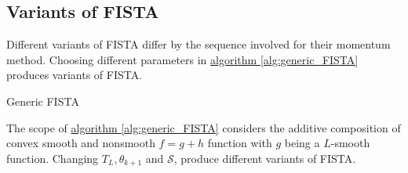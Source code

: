 \documentclass[]{article}
\theoremstyle{definition}
\numberwithin{equation}{subsection}
\begin{document}
    \subsection*{Variants of FISTA}
        Different variants of FISTA differ by the sequence involved for their momentum method. 
        Choosing different parameters in \hyperref[alg:generic_FISTA]{algorithm \ref*{alg:generic_FISTA}} produces variants of FISTA. 
        \begin{algorithm}[H]
            \begin{algorithmic}[1]
                \ENDFOR
            \end{algorithmic}
            \caption{Generic FISTA}
            \label{alg:generic_FISTA}
        \end{algorithm}
        The scope of \hyperref[alg:generic_FISTA]{algorithm \ref*{alg:generic_FISTA}} considers the additive composition of convex smooth and nonsmooth $f = g + h$ function with $g$ being a $L$-smooth function. 
        Changing $T_L, \theta_{k + 1}$ and $\mathcal S$, produce different variants of FISTA. 
\end{document}
